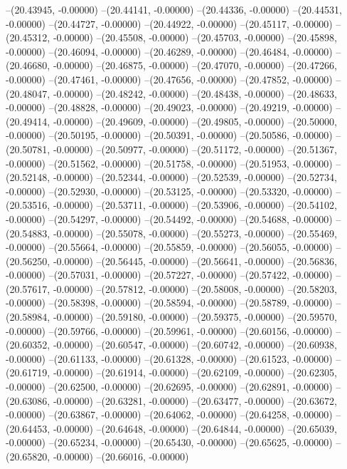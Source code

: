 --(20.43945, -0.00000)
--(20.44141, -0.00000)
--(20.44336, -0.00000)
--(20.44531, -0.00000)
--(20.44727, -0.00000)
--(20.44922, -0.00000)
--(20.45117, -0.00000)
--(20.45312, -0.00000)
--(20.45508, -0.00000)
--(20.45703, -0.00000)
--(20.45898, -0.00000)
--(20.46094, -0.00000)
--(20.46289, -0.00000)
--(20.46484, -0.00000)
--(20.46680, -0.00000)
--(20.46875, -0.00000)
--(20.47070, -0.00000)
--(20.47266, -0.00000)
--(20.47461, -0.00000)
--(20.47656, -0.00000)
--(20.47852, -0.00000)
--(20.48047, -0.00000)
--(20.48242, -0.00000)
--(20.48438, -0.00000)
--(20.48633, -0.00000)
--(20.48828, -0.00000)
--(20.49023, -0.00000)
--(20.49219, -0.00000)
--(20.49414, -0.00000)
--(20.49609, -0.00000)
--(20.49805, -0.00000)
--(20.50000, -0.00000)
--(20.50195, -0.00000)
--(20.50391, -0.00000)
--(20.50586, -0.00000)
--(20.50781, -0.00000)
--(20.50977, -0.00000)
--(20.51172, -0.00000)
--(20.51367, -0.00000)
--(20.51562, -0.00000)
--(20.51758, -0.00000)
--(20.51953, -0.00000)
--(20.52148, -0.00000)
--(20.52344, -0.00000)
--(20.52539, -0.00000)
--(20.52734, -0.00000)
--(20.52930, -0.00000)
--(20.53125, -0.00000)
--(20.53320, -0.00000)
--(20.53516, -0.00000)
--(20.53711, -0.00000)
--(20.53906, -0.00000)
--(20.54102, -0.00000)
--(20.54297, -0.00000)
--(20.54492, -0.00000)
--(20.54688, -0.00000)
--(20.54883, -0.00000)
--(20.55078, -0.00000)
--(20.55273, -0.00000)
--(20.55469, -0.00000)
--(20.55664, -0.00000)
--(20.55859, -0.00000)
--(20.56055, -0.00000)
--(20.56250, -0.00000)
--(20.56445, -0.00000)
--(20.56641, -0.00000)
--(20.56836, -0.00000)
--(20.57031, -0.00000)
--(20.57227, -0.00000)
--(20.57422, -0.00000)
--(20.57617, -0.00000)
--(20.57812, -0.00000)
--(20.58008, -0.00000)
--(20.58203, -0.00000)
--(20.58398, -0.00000)
--(20.58594, -0.00000)
--(20.58789, -0.00000)
--(20.58984, -0.00000)
--(20.59180, -0.00000)
--(20.59375, -0.00000)
--(20.59570, -0.00000)
--(20.59766, -0.00000)
--(20.59961, -0.00000)
--(20.60156, -0.00000)
--(20.60352, -0.00000)
--(20.60547, -0.00000)
--(20.60742, -0.00000)
--(20.60938, -0.00000)
--(20.61133, -0.00000)
--(20.61328, -0.00000)
--(20.61523, -0.00000)
--(20.61719, -0.00000)
--(20.61914, -0.00000)
--(20.62109, -0.00000)
--(20.62305, -0.00000)
--(20.62500, -0.00000)
--(20.62695, -0.00000)
--(20.62891, -0.00000)
--(20.63086, -0.00000)
--(20.63281, -0.00000)
--(20.63477, -0.00000)
--(20.63672, -0.00000)
--(20.63867, -0.00000)
--(20.64062, -0.00000)
--(20.64258, -0.00000)
--(20.64453, -0.00000)
--(20.64648, -0.00000)
--(20.64844, -0.00000)
--(20.65039, -0.00000)
--(20.65234, -0.00000)
--(20.65430, -0.00000)
--(20.65625, -0.00000)
--(20.65820, -0.00000)
--(20.66016, -0.00000)
